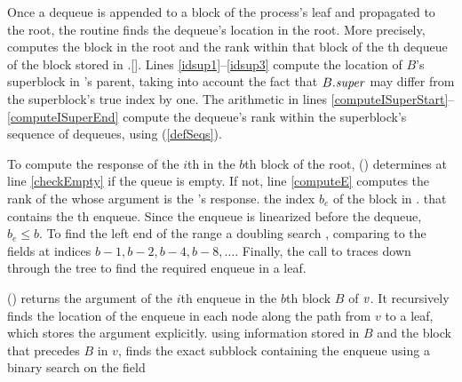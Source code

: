 Once a dequeue is appended to a block of the process's leaf and propagated to the root,
the  routine finds the dequeue's location in the root.
More precisely, 
computes the block in the root and the rank
within that block  of the th dequeue of the block  stored in .[].
Lines \ref{idsup1}--\ref{idsup3} compute the location of $B$'s superblock in 's parent, taking into account the fact that $B.\mbox{\textit{super}}$ may differ from the superblock's true index by one.
The arithmetic in lines \ref{computeISuperStart}--\ref{computeISuperEnd} compute the dequeue's 
rank within the superblock's sequence of dequeues, using  (\ref{defSeqs}).


To compute the response of the $i$th  in the $b$th block
of the root, () determines at line \ref{checkEmpty} if the queue is empty.
If not, line \ref{computeE} computes the rank  of the
 whose argument is the 's response. 
the index $b_e$ of the block in . that contains 
the th enqueue.
Since the enqueue is linearized before the dequeue, $b_e\leq b$.  To find the left end of the range  a doubling search \cite{BY76}, comparing  to the  fields at indices $b-1, b-2, b-4, b-8, \ldots$.
Finally, the call to   traces down through the tree to find the required enqueue in a leaf.

() returns the argument of the
$i$th enqueue in the $b$th block $B$ of  $\mbox{\textnormal{\textit{v}}}$. 
It recursively finds the location of the enqueue in each node along the path from $v$ to a leaf, which stores the argument explicitly.
using information stored
in $B$ and the block that precedes $B$ in $v$,
finds the exact subblock containing the enqueue using a binary search on the 
field 



